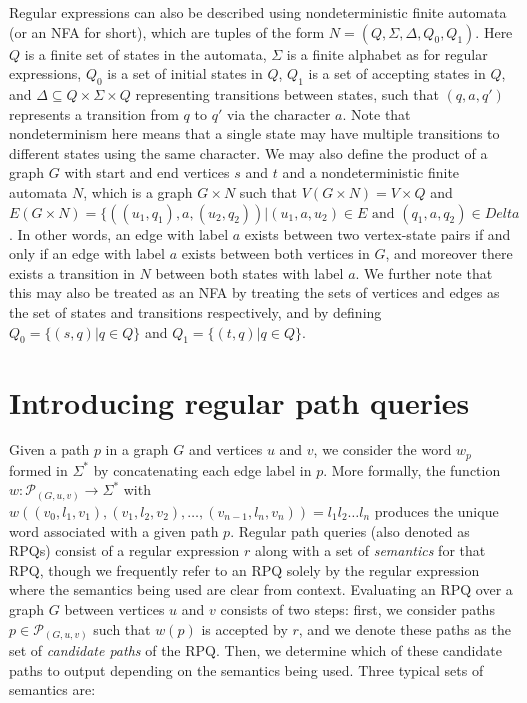 \documentclass{article}
\begin{document}
Regular expressions can also be described using nondeterministic finite automata (or an NFA for short), which are tuples of the form $N = (Q, \Sigma, \Delta, Q_0, Q_1)$. Here $Q$ is a finite set of states in the automata, $\Sigma$ is a finite alphabet as for regular expressions, $Q_0$ is a set of initial states in $Q$, $Q_1$ is a set of accepting states in $Q$, and $\Delta \subseteq Q \times \Sigma \times Q$ representing transitions between states, such that $(q, a, q')$ represents a transition from $q$ to $q'$ via the character $a$. Note that nondeterminism here means that a single state may have multiple transitions to different states using the same character. We may also define the product of a graph $G$ with start and end vertices $s$ and $t$ and a nondeterministic finite automata $N$, which is a graph $G \times N$ such that $V(G \times N) = V \times Q$ and $E(G \times N) = \{((u_1, q_1), a, (u_2,q_2)) | (u_1, a, u_2) \in E \text{ and } (q_1, a, q_2) \in Delta$. In other words, an edge with label $a$ exists between two vertex-state pairs if and only if an edge with label $a$ exists between both vertices in $G$, and moreover there exists a transition in $N$ between both states with label $a$. We further note that this may also be treated as an NFA by treating the sets of vertices and edges as the set of states and transitions respectively, and by defining $Q_0 = \{(s, q) | q \in Q\}$ and $Q_1 = \{(t, q) | q \in Q\}$.

\section{Introducing regular path queries}
\label{sec:intro_rpqs}

Given a path $p$ in a graph $G$ and vertices $u$ and $v$, we consider the word $w_p$ formed in $\Sigma^*$ by concatenating each edge label in $p$. More formally, the function $w: \mathcal{P}_{(G,u,v)} \rightarrow \Sigma^*$ with $w \left((v_0, l_1, v_1), (v_1, l_2, v_2), \dots, (v_{n-1}, l_n, v_n) \right) = l_1 l_2 \dots l_n$ produces the unique word associated with a given path $p$. Regular path queries (also denoted as RPQs) consist of a regular expression $r$ along with a set of \emph{semantics} for that RPQ, though we frequently refer to an RPQ solely by the regular expression where the semantics being used are clear from context. Evaluating an RPQ over a graph $G$ between vertices $u$ and $v$ consists of two steps: first, we consider paths $p \in \mathcal{P}_{(G,u,v)}$ such that $w(p)$ is accepted by $r$, and we denote these paths as the set of \emph{candidate paths} of the RPQ. Then, we determine which of these candidate paths to output depending on the semantics being used. Three typical sets of semantics are:
\end{document}
